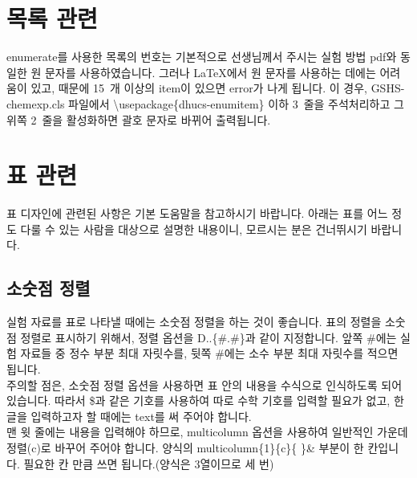 \documentclass[a4paper,10pt]{article}
\begin{document}
	\section{목록 관련}
	enumerate를 사용한 목록의 번호는 기본적으로 선생님께서 주시는
	실험 방법 pdf와 동일한 원 문자를 사용하였습니다.
	그러나 \LaTeX 에서 원 문자를 사용하는 데에는 어려움이 있고, 때문에
	15~개 이상의 item이 있으면 error가 나게 됩니다. 이 경우,
	GSHS-chemexp.cls 파일에서
	\textbackslash usepackage\{dhucs-enumitem\} 이하 3~줄을
	주석처리하고 그 위쪽 2~줄을 활성화하면 괄호 문자로 바뀌어 출력됩니다.
	
	\section{표 관련}
	
	표 디자인에 관련된 사항은 기본 도움말을 참고하시기 바랍니다.
	아래는 표를 어느 정도 다룰 수 있는 사람을 대상으로
	설명한 내용이니, 모르시는 분은 건너뛰시기 바랍니다.
	
	\subsection{소숫점 정렬}
	실험 자료를 표로 나타낼 때에는 소숫점 정렬을 하는 것이 좋습니다.
	표의 정렬을 소숫점 정렬로 표시하기 위해서, 정렬 옵션을
	D..\{\#.\#\}과 같이 지정합니다.
	앞쪽 \#에는 실험 자료들 중 정수 부분 최대 자릿수를,
	뒷쪽 \#에는 소수 부분 최대 자릿수를 적으면 됩니다.\\
	주의할 점은, 소숫점 정렬 옵션을 사용하면 표 안의 내용을
	수식으로 인식하도록 되어 있습니다. 따라서 \$과 같은 기호를 사용하여
	따로 수학 기호를 입력할 필요가 없고, 한글을 입력하고자 할 때에는 
	text를 써 주어야 합니다.\\
	맨 윗 줄에는 내용을 입력해야 하므로, multicolumn 옵션을 사용하여
	일반적인 가운데 정렬(c)로 바꾸어 주어야 합니다.
	양식의 multicolumn\{1\}\{c\}\{ \}\& 부분이 한 칸입니다.
	필요한 칸 만큼 쓰면 됩니다.(양식은 3열이므로 세 번)
	
\end{document}
